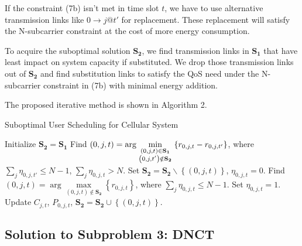 \documentclass{ieeeaccess}
\begin{document}
If the constraint (7b) isn't met in time slot ${t}$, we have to use alternative transmission links like $0 \to j@t'$ for replacement. These replacement will satisfy the N-subcarrier constraint at the cost of more energy consumption. 

To acquire the suboptimal solution ${{\mathbf{S}}_{\mathbf{2}}}$, we find transmission links in ${{\mathbf{S}}_{\mathbf{1}}}$ that have least impact on system capacity if substituted. We drop those transmission links out of ${{\mathbf{S}}_{\mathbf{2}}}$ and find substitution links to satisfy the QoS need under the N-subcarrier constraint in (7b) with minimal energy addition. 

The proposed iterative method is shown in Algorithm 2.

\begin{algorithm}[h]
\caption{Suboptimal User Scheduling for Cellular System}
\label{alg:1}
\begin{algorithmic}[1]
\STATE Initialize ${{\mathbf{S}}_{\mathbf{2}}}={{\mathbf{S}}_{\mathbf{1}}}$
  \STATE Find $\left( {0,j,t} \right) = \arg \mathop {\min }\limits_{\scriptstyle \left( {0,j,t} \right) \in {{\mathbf{S}}_{\mathbf{1}}} \atop
  \scriptstyle \left( {0,j,t'} \right) \notin {{\mathbf{S}}_{\mathbf{2}}}}  \left\{ {{r_{0,j,t}} - {r_{0,j,t'}}} \right\}$, where $\sum\limits_{j} {{\eta _{0,j,t'}}}  \le N - 1$, $\sum\limits_j {{\eta _{0,j,t}} > N} $.
  \STATE Set ${{\mathbf{S}}_{\mathbf{2}}}={{\mathbf{S}}_{\mathbf{2}}}\backslash \left\{ {\left( {0,j,t} \right)} \right\}$, ${\eta _{0,j,t}} = 0$.
    \STATE Find ${\left( {0,j,t} \right) = \arg \mathop {\max }\limits_{\left( {0,j,t} \right) \notin {{\mathbf{S}}_{\mathbf{2}}}} \left\{ {{r_{0,j,t}}} \right\}}$, where ${\sum\limits_j {{\eta _{0,j,t}}}  \le N - 1}$.
    \STATE Set ${\eta _{0,j,t}} = 1$.
    \STATE Update ${C_{j,t}}$, ${P_{0,j,t}}$, ${{\mathbf{S}}_{\mathbf{2}}}={{\mathbf{S}}_{\mathbf{2}}} \cup \left\{ {\left( {0,j,t} \right)} \right\}$.
  \ENDWHILE
\ENDWHILE
\end{algorithmic}
\end{algorithm}

\subsection{Solution to \textbf{Subproblem 3: DNCT}}
\end{document}
